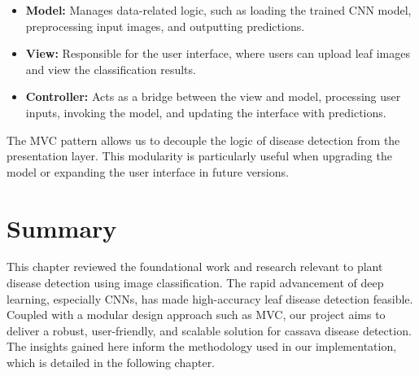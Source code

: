 \begin{itemize}
    \item \textbf{Model:} Manages data-related logic, such as loading the trained CNN model, preprocessing input images, and outputting predictions.
    \item \textbf{View:} Responsible for the user interface, where users can upload leaf images and view the classification results.
    \item \textbf{Controller:} Acts as a bridge between the view and model, processing user inputs, invoking the model, and updating the interface with predictions.
\end{itemize}

The MVC pattern allows us to decouple the logic of disease detection from the presentation layer. This modularity is particularly useful when upgrading the model or expanding the user interface in future versions.

\section{Summary}
This chapter reviewed the foundational work and research relevant to plant disease detection using image classification. The rapid advancement of deep learning, especially CNNs, has made high-accuracy leaf disease detection feasible. Coupled with a modular design approach such as MVC, our project aims to deliver a robust, user-friendly, and scalable solution for cassava disease detection. The insights gained here inform the methodology used in our implementation, which is detailed in the following chapter.
